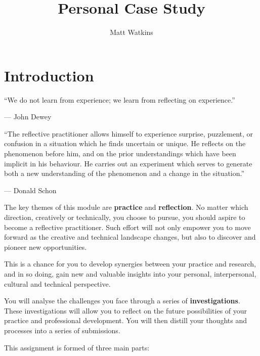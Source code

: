 \documentclass{../../fal_assignment}
\title{Personal Case Study}
\author{Matt Watkins}
\begin{document}
\maketitle

\section*{Introduction}

\begin{marginquote}
“We do not learn from experience; we learn from reflecting on experience.”

— John Dewey

“The reflective practitioner allows himself to experience surprise, puzzlement, or confusion in a situation which he finds uncertain or unique. He reflects on the phenomenon before him, and on the prior understandings which have been implicit in his behaviour. He carries out an experiment which serves to generate both a new understanding of the phenomenon and a change in the situation.”

— Donald Schon
\end{marginquote}

The key themes of this module are \textbf{practice} and \textbf{reflection}. No matter which direction, creatively or technically, you choose to pursue, you should aspire to become a reflective practitioner. Such effort will not only empower you to move forward as the creative and technical landscape changes, but also to discover and pioneer new opportunities.

This is a chance for you to develop synergies between your practice and research, and in so doing, gain new and valuable insights into your personal, interpersonal, cultural and technical perspective.

You will analyse the challenges you face through a series of \textbf{investigations}. These investigations will allow you to reflect on the future possibilities of your practice and professional development. You will then distill your thoughts and processes into a series of submissions.

This assignment is formed of three main parts:
\end{document}
